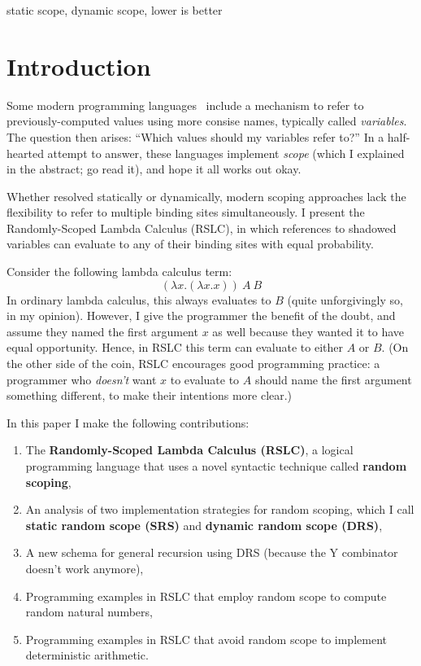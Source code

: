 \documentclass[10pt]{sigplanconf}
\begin{document}

\keywords
static scope, dynamic scope, lower is better

\section{Introduction}

Some modern programming languages~\cite{wikiplia,python,lambda,sml,GoLang,RustLang,mla,haskell98,patenttroll} include a mechanism to refer to previously-computed values using more consise names, typically called {\em variables}. The question then arises: ``Which values should my variables refer to?''
In a half-hearted attempt to answer, these languages implement {\em scope} (which I explained in the abstract; go read it), and hope it all works out okay.

Whether resolved statically or dynamically, modern scoping approaches lack the flexibility to refer to multiple binding sites simultaneously.
I present the Randomly-Scoped Lambda Calculus (RSLC), in which references to shadowed variables can evaluate to any of their binding sites with equal probability.

Consider the following lambda calculus term:
\[ (\lambda x. (\lambda x. x))~A~B \]
In ordinary lambda calculus, this always evaluates to $B$ (quite unforgivingly so, in my opinion).
However, I give the programmer the benefit of the doubt, and assume they named the first argument $x$ as well because they wanted it to have equal opportunity. Hence, in RSLC this term can evaluate to either $A$ or $B$.
(On the other side of the coin, RSLC encourages good programming practice: a programmer who {\em doesn't} want $x$ to evaluate to $A$ should name the first argument something different, to make their intentions more clear.)

In this paper I make the following contributions:
\begin{enumerate}
	\item The {\bf Randomly-Scoped Lambda Calculus (RSLC)}, a logical programming language that uses a novel syntactic technique called {\bf random scoping},
	\item An analysis of two implementation strategies for random scoping, which I call {\bf static random scope (SRS)} and {\bf dynamic random scope (DRS)},
	\item A new schema for general recursion using DRS (because the Y combinator doesn't work anymore),
	\item Programming examples in RSLC that employ random scope to compute random natural numbers,
	\item Programming examples in RSLC that avoid random scope to implement deterministic arithmetic.
\end{enumerate}
\end{document}
